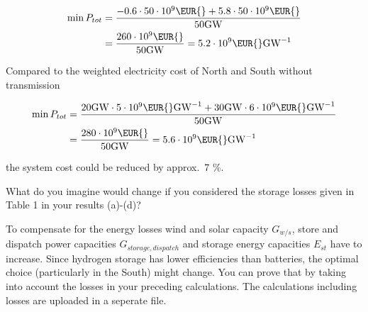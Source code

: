 \documentclass[11pt,a4paper,fleqn]{scrartcl}
\newcommand{\eur}{\text{\EUR{}}}
\begin{document}
\begin{enumerate}[(a)]
\begin{align*}
\min P_{tot} & = \frac{-0.6 \cdot 50 \cdot 10^9 \eur + 5.8 \cdot 50 \cdot 10^9 \eur}{50 \si{\giga\watt}}  \\
& = \frac{260 \cdot 10^9 \eur}{50 \si{\giga\watt}} = 5.2 \cdot 10^9 \eur \si{\per\giga\watt}
\end{align*}

Compared to the weighted electricity cost of North and South without transmission

\begin{align*}
\min P_{tot} & = \frac{20\si{\giga\watt}\cdot 5 \cdot 10^9 \eur \si{\per\giga\watt} + 30\si{\giga\watt}\cdot 6 \cdot 10^9 \eur \si{\per\giga\watt}}{50 \si{\giga\watt}} \\
& = \frac{280 \cdot 10^9 \eur}{50 \si{\giga\watt}} = 5.6 \cdot 10^9 \eur \si{\per\giga\watt}
\end{align*}

the system cost could be reduced by approx.\ 7 \%.


  \begin{shaded}
 	\item What do you imagine would change if you considered the storage losses given in Table 1 in your results (a)-(d)?
 \end{shaded}
 
 To compensate for the energy losses wind and solar capacity $G_{w/s}$, store and dispatch power capacities $G_{storage,dispatch}$ and storage energy capacities $E_{st}$ have to increase. Since hydrogen storage has lower efficiencies than batteries, the optimal choice (particularly in the South) might change. You can prove that by taking into account the losses in your preceding calculations. The calculations including losses are uploaded in a seperate file.
 
 
\end{enumerate}
\end{document}
